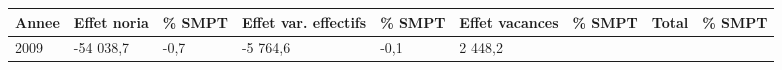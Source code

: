 \begin{longtable}[]{@{}lllllllll@{}}
\toprule
\begin{minipage}[b]{0.05\columnwidth}\raggedright
Annee\strut
\end{minipage} & \begin{minipage}[b]{0.10\columnwidth}\raggedright
Effet noria\strut
\end{minipage} & \begin{minipage}[b]{0.06\columnwidth}\raggedright
\% SMPT\strut
\end{minipage} & \begin{minipage}[b]{0.16\columnwidth}\raggedright
Effet var. effectifs\strut
\end{minipage} & \begin{minipage}[b]{0.06\columnwidth}\raggedright
\% SMPT\strut
\end{minipage} & \begin{minipage}[b]{0.12\columnwidth}\raggedright
Effet vacances\strut
\end{minipage} & \begin{minipage}[b]{0.06\columnwidth}\raggedright
\% SMPT\strut
\end{minipage} & \begin{minipage}[b]{0.09\columnwidth}\raggedright
Total\strut
\end{minipage} & \begin{minipage}[b]{0.06\columnwidth}\raggedright
\% SMPT\strut
\end{minipage}\tabularnewline
\midrule
\endhead
\begin{minipage}[t]{0.05\columnwidth}\raggedright
2009\strut
\end{minipage} & \begin{minipage}[t]{0.10\columnwidth}\raggedright
-54 038,7\strut
\end{minipage} & \begin{minipage}[t]{0.06\columnwidth}\raggedright
-0,7\strut
\end{minipage} & \begin{minipage}[t]{0.16\columnwidth}\raggedright
-5 764,6\strut
\end{minipage} & \begin{minipage}[t]{0.06\columnwidth}\raggedright
-0,1\strut
\end{minipage} & \begin{minipage}[t]{0.12\columnwidth}\raggedright
2 448,2\strut
\end{minipage} & \begin{minipage}[t]{0.06\columnwidth}\raggedright

\end{minipage}
\end{longtable}
